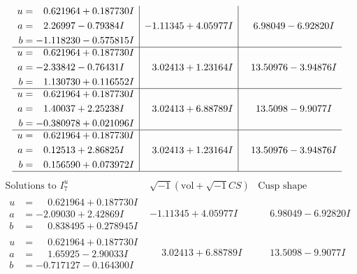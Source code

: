 \documentclass[1p]{elsarticle_modified}
\theoremstyle{definition}
\newcommand{\I}{\sqrt{-1}}
\begin{document}
$$\begin{array}{c|c|c}
\begin{aligned}
u &= \phantom{-}0.621964 + 0.187730 I \\
a &= \phantom{-}2.26997 - 0.79384 I \\
b &= -1.118230 - 0.575815 I\end{aligned}
 & -1.11345 + 4.05977 I & \phantom{-}6.98049 - 6.92820 I \\ \hline\begin{aligned}
u &= \phantom{-}0.621964 + 0.187730 I \\
a &= -2.33842 - 0.76431 I \\
b &= \phantom{-}1.130730 + 0.116552 I\end{aligned}
 & \phantom{-}3.02413 + 1.23164 I & \phantom{-}13.50976 - 3.94876 I \\ \hline\begin{aligned}
u &= \phantom{-}0.621964 + 0.187730 I \\
a &= \phantom{-}1.40037 + 2.25238 I \\
b &= -0.380978 + 0.021096 I\end{aligned}
 & \phantom{-}3.02413 + 6.88789 I & \phantom{-}13.5098 - 9.9077 I \\ \hline\begin{aligned}
u &= \phantom{-}0.621964 + 0.187730 I \\
a &= \phantom{-}0.12513 + 2.86825 I \\
b &= \phantom{-}0.156590 + 0.073972 I\end{aligned}
 & \phantom{-}3.02413 + 1.23164 I & \phantom{-}13.50976 - 3.94876 I\\
 \hline 
 \end{array}$$\newpage$$\begin{array}{c|c|c}  
\text{Solutions to }I^u_{7}& \I (\text{vol} + \sqrt{-1}CS) & \text{Cusp shape}\\
 \hline 
\begin{aligned}
u &= \phantom{-}0.621964 + 0.187730 I \\
a &= -2.09030 + 2.42869 I \\
b &= \phantom{-}0.838495 + 0.278945 I\end{aligned}
 & -1.11345 + 4.05977 I & \phantom{-}6.98049 - 6.92820 I \\ \hline\begin{aligned}
u &= \phantom{-}0.621964 + 0.187730 I \\
a &= \phantom{-}1.65925 - 2.90033 I \\
b &= -0.717127 - 0.164300 I\end{aligned}
 & \phantom{-}3.02413 + 6.88789 I & \phantom{-}13.5098 - 9.9077 I \\ \hline\begin{aligned}

\end{aligned}
\end{array}$$
\end{document}
